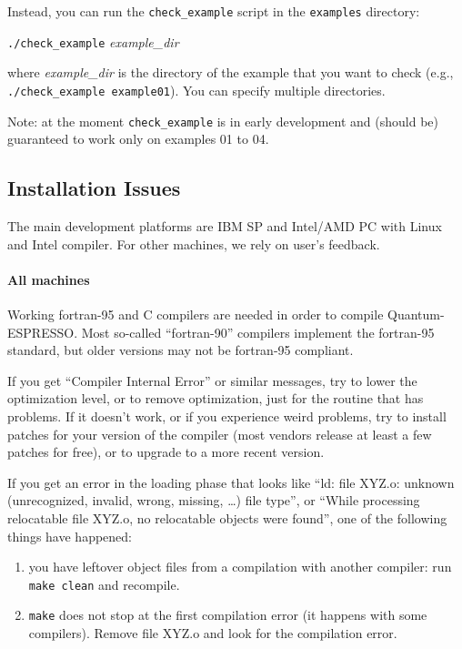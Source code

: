 \documentclass[12pt,a4paper]{article}
\begin{document}
\begin{enumerate}
Instead, you can run the \texttt{check\_example} script in the
\texttt{examples} directory:
\medskip

\quad\texttt{./check\_example} \emph{example\_dir}
\medskip

\noindent
where \emph{example\_dir} is the directory of the example that you
want to check (e.g., \texttt{./check\_example example01}).
You can specify multiple directories.

Note: at the moment \texttt{check\_example} is in early development
and (should be) guaranteed to work only on examples 01 to 04.
\end{enumerate}


\subsection{Installation Issues}
  \label{installissues}

The main development platforms are IBM SP and Intel/AMD PC with Linux
and Intel compiler.  For other machines, we rely on user's feedback.

\paragraph{All machines}

Working fortran-95 and C compilers are needed in order to compile 
Quantum-ESPRESSO. Most so-called ``fortran-90'' compilers implement the 
fortran-95 standard, but older versions may not be fortran-95
compliant.

If you get ``Compiler Internal Error'' or similar messages, try to
lower the optimization level, or to remove optimization, just for the
routine that has problems.  If it doesn't work, or if you experience
weird problems, try to install patches for your version of the
compiler (most vendors release at least a few patches for free), or to
upgrade to a more recent version.

If you get an error in the loading phase that looks like ``ld: file
XYZ.o: unknown (unrecognized, invalid, wrong, missing, \dots) file
type'', or ``While processing relocatable file XYZ.o, no relocatable
objects were found'', one of the following things have happened:

\begin{enumerate}
  \item you have leftover object files from a compilation with another 
        compiler: run \texttt{make clean} and recompile.
  \item \texttt{make} does not stop at the first compilation error (it
        happens with some compilers).
        Remove file XYZ.o and look for the compilation error.
\end{enumerate}
\end{document}
